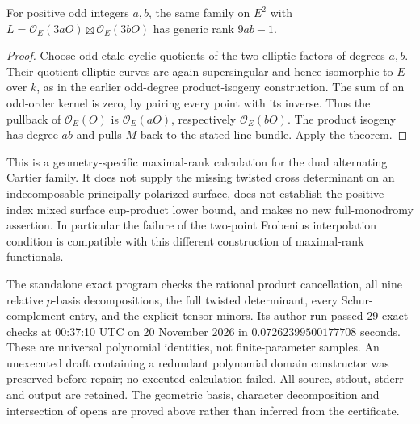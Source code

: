 \begin{corollary}
\label{cor:DE-SS-odd-rectangle-dual-rank}
For positive odd integers \(a,b\), the same family on
\(E^2\) with \(L=\mathcal O_E(3aO)\boxtimes
\mathcal O_E(3bO)\) has generic rank \(9ab-1\).
\end{corollary}
\begin{proof}
Choose odd etale cyclic quotients of the two elliptic factors
of degrees \(a,b\). Their quotient elliptic curves are again
supersingular and hence isomorphic to \(E\) over \(k\), as
in the earlier odd-degree product-isogeny construction. The
sum of an odd-order kernel is zero, by pairing every point
with its inverse. Thus the pullback of \(\mathcal O_E(O)\)
is \(\mathcal O_E(aO)\), respectively \(\mathcal O_E(bO)\).
The product isogeny has degree \(ab\) and pulls \(M\) back
to the stated line bundle. Apply the theorem.
\end{proof}

\begin{remark}
\label{rem:DE-SS-cross-scope}
This is a geometry-specific maximal-rank calculation for the
dual alternating Cartier family. It does not supply the missing
twisted cross determinant on an indecomposable principally
polarized surface, does not establish the positive-index mixed
surface cup-product lower bound, and makes no new full-monodromy
assertion. In particular the failure of the two-point Frobenius
interpolation condition is compatible with this different
construction of maximal-rank functionals.

The standalone exact program
checks the rational product cancellation, all nine relative
\(p\)-basis decompositions, the full twisted determinant,
every Schur-complement entry, and the explicit tensor minors.
Its author run passed 29 exact checks at 00:37:10 UTC on
20 November 2026 in \(0.07262399500177708\) seconds.
These are universal polynomial identities, not finite-parameter
samples. An unexecuted draft containing a redundant polynomial
domain constructor was preserved before repair; no executed
calculation failed. All source, stdout, stderr and output are
retained. The geometric basis, character decomposition and
intersection of opens are proved above rather than inferred
from the certificate.
\end{remark}

